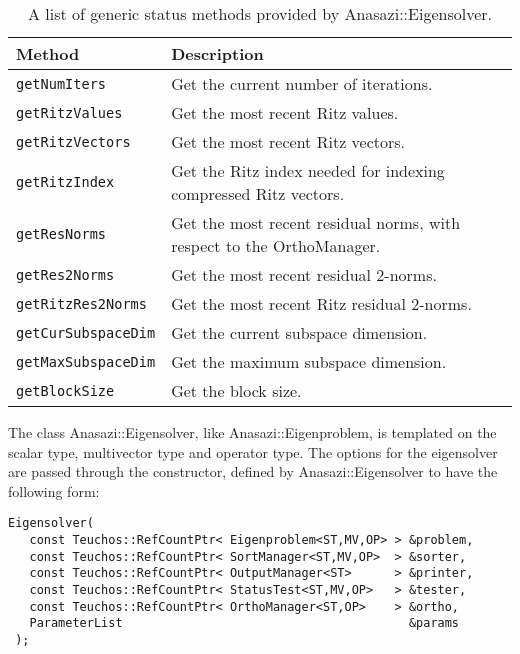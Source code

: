 \begin{table}[htp]
\begin{center}
\begin{tabular}{| p{4cm} p{10cm} |}
\hline
Method & Description \\
\hline
{\tt getNumIters}       & Get the current number of iterations. \\
{\tt getRitzValues}     & Get the most recent Ritz values. \\
{\tt getRitzVectors}    & Get the most recent Ritz vectors. \\
{\tt getRitzIndex}      & Get the Ritz index needed for indexing compressed Ritz vectors. \\
{\tt getResNorms}       & Get the most recent residual norms, with respect to the OrthoManager. \\
{\tt getRes2Norms}      & Get the most recent residual 2-norms. \\
{\tt getRitzRes2Norms}  & Get the most recent Ritz residual 2-norms. \\
{\tt getCurSubspaceDim} & Get the current subspace dimension. \\
{\tt getMaxSubspaceDim} & Get the maximum subspace dimension. \\
{\tt getBlockSize}      & Get the block size. \\
\hline
\end{tabular}
\caption{A list of generic status methods provided by Anasazi::Eigensolver.}
\label{tab:anasazi:genstatusmethods}
\end{center}
\end{table}

The class Anasazi::Eigensolver, like Anasazi::Eigenproblem, is templated on the scalar
type, multivector type and operator type. The options for the eigensolver are passed
through the constructor, defined by Anasazi::Eigensolver to have the following form:
\begin{verbatim}
Eigensolver( 
   const Teuchos::RefCountPtr< Eigenproblem<ST,MV,OP> > &problem, 
   const Teuchos::RefCountPtr< SortManager<ST,MV,OP>  > &sorter,
   const Teuchos::RefCountPtr< OutputManager<ST>      > &printer,
   const Teuchos::RefCountPtr< StatusTest<ST,MV,OP>   > &tester,
   const Teuchos::RefCountPtr< OrthoManager<ST,OP>    > &ortho,
   ParameterList                                        &params  
 );
\end{verbatim}

